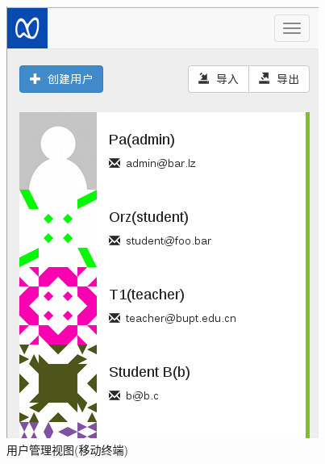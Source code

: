 \begin{figure}[!h]
  \begin{center}
    \includegraphics[scale=0.5]{figures/screenshot-responsive.png}
    \caption{用户管理视图(移动终端)\label{SSResponsive}}
  \end{center}
\end{figure}

